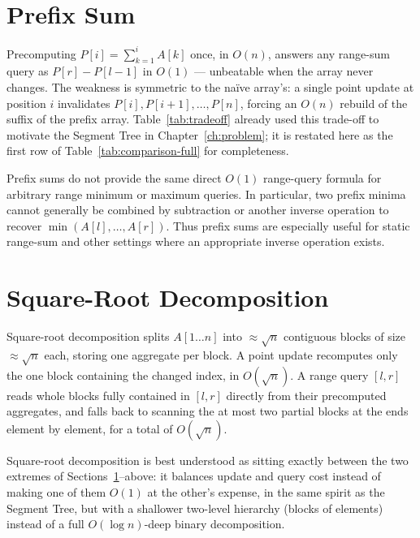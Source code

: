 \documentclass[
  11pt,
  a4paper,
  twoside=false,
  numbers=noenddot,
  headings=big,
  parskip=half,
  toc=bibliography,
  toc=listof,
  bibliography=totoc
]{scrreprt}
\newcommand{\Oh}[1]{O\!\left(#1\right)}
\begin{document}
\section{Prefix Sum}
\label{sec:prefixsum}
Precomputing $P[i]=\sum_{k=1}^{i}A[k]$ once, in $\Oh{n}$, answers any range-sum query as $P[r]-P[l-1]$ in $\Oh{1}$ --- unbeatable when the array never changes. The weakness is symmetric to the na\"ive array's: a single point update at position $i$ invalidates $P[i],P[i+1],\ldots,P[n]$, forcing an $\Oh{n}$ rebuild of the suffix of the prefix array. Table~\ref{tab:tradeoff} already used this trade-off to motivate the Segment Tree in Chapter~\ref{ch:problem}; it is restated here as the first row of Table~\ref{tab:comparison-full} for completeness.

\begin{pitfall}
Prefix sums do not provide the same direct $O(1)$ range-query formula for arbitrary range minimum or maximum queries. In particular, two prefix minima cannot generally be combined by subtraction or another inverse operation to recover $\min(A[l],\ldots,A[r])$. Thus prefix sums are especially useful for static range-sum and other settings where an appropriate inverse operation exists.
\end{pitfall}

\section{Square-Root Decomposition}
\label{sec:sqrtdecomp}
Square-root decomposition splits $A[1\ldots n]$ into $\approx\sqrt{n}$ contiguous blocks of size $\approx\sqrt{n}$ each, storing one aggregate per block. A point update recomputes only the one block containing the changed index, in $\Oh{\sqrt n}$. A range query $[l,r]$ reads whole blocks fully contained in $[l,r]$ directly from their precomputed aggregates, and falls back to scanning the at most two partial blocks at the ends element by element, for a total of $\Oh{\sqrt n}$.

\begin{keyidea}
Square-root decomposition is best understood as sitting exactly between the two extremes of Sections~\ref{sec:prefixsum}--above: it balances update and query cost instead of making one of them $\Oh{1}$ at the other's expense, in the same spirit as the Segment Tree, but with a shallower two-level hierarchy (blocks of elements) instead of a full $\Oh{\log n}$-deep binary decomposition.
\end{keyidea}
\end{document}
